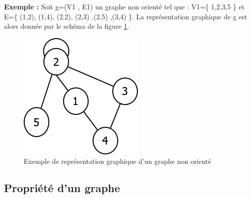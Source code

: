 \textbf{Exemple :}
 Soit g=(V1 , E1) un graphe non orienté tel que : V1=\{ 1,2,3,5 \} et E=\{ (1,2), (1,4), (2,2), (2,3) ,(2,5) ,(3,4) \}.
La représentation graphique de g est alors donnée par le schéma de la figure \ref{graphNonOriente}.
\\
\begin{figure}[H]
\begin{center}
\includegraphics[height=120 pt, width=130 pt]{./ressources/image/graphNonOriente.png} 
\end{center}
\caption{Exemple de représentation graphique d'un graphe non orienté}
\label{graphNonOriente}
\end{figure}

		\subsection{Propriété d'un graphe}
		
